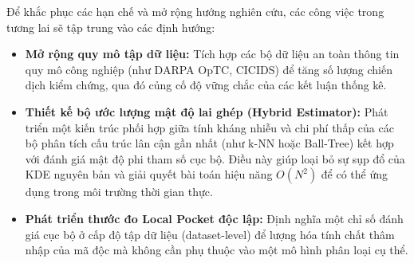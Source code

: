 \documentclass[../main.tex]{subfiles}
\begin{document}
Để khắc phục các hạn chế và mở rộng hướng nghiên cứu, các công việc trong tương lai sẽ tập trung vào các định hướng:
\begin{itemize}
    \item \textbf{Mở rộng quy mô tập dữ liệu:} Tích hợp các bộ dữ liệu an toàn thông tin quy mô công nghiệp (như DARPA OpTC, CICIDS) để tăng số lượng chiến dịch kiểm chứng, qua đó củng cố độ vững chắc của các kết luận thống kê.
    \item \textbf{Thiết kế bộ ước lượng mật độ lai ghép (Hybrid Estimator):} Phát triển một kiến trúc phối hợp giữa tính kháng nhiễu và chi phí thấp của các bộ phân tích cấu trúc lân cận gần nhất (như k-NN hoặc Ball-Tree) kết hợp với đánh giá mật độ phi tham số cục bộ. Điều này giúp loại bỏ sự sụp đổ của KDE nguyên bản và giải quyết bài toán hiệu năng $O(N^2)$ để có thể ứng dụng trong môi trường thời gian thực.
    \item \textbf{Phát triển thước đo Local Pocket độc lập:} Định nghĩa một chỉ số đánh giá cục bộ ở cấp độ tập dữ liệu (dataset-level) để lượng hóa tính chất thâm nhập của mã độc mà không cần phụ thuộc vào một mô hình phân loại cụ thể.
\end{itemize}
\end{document}
